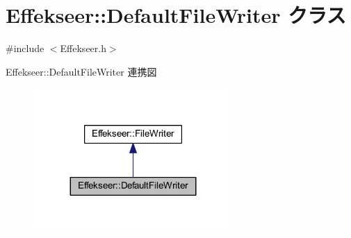 \hypertarget{class_effekseer_1_1_default_file_writer}{}\section{Effekseer\+:\+:Default\+File\+Writer クラス}
\label{class_effekseer_1_1_default_file_writer}


{\ttfamily \#include $<$Effekseer.\+h$>$}



Effekseer\+:\+:Default\+File\+Writer 連携図\nopagebreak
\begin{figure}[H]
\begin{center}
\leavevmode
\includegraphics[width=215pt]{class_effekseer_1_1_default_file_writer__coll__graph}
\end{center}
\end{figure}
